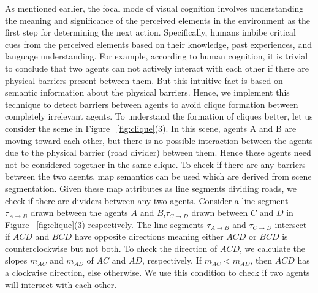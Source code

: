 \documentclass[letterpaper, 10 pt, conference]{ieeeconf}  %
\begin{document}
As mentioned earlier, the focal mode of visual cognition involves understanding the meaning and significance of the perceived elements in the environment as the first step for determining the next action. Specifically, humans imbibe critical cues from the perceived elements based on their knowledge, past experiences, and language understanding. For example, according to human cognition, it is trivial to conclude that two agents can not actively interact with each other if there are physical barriers present between them. But this intuitive fact is based on semantic information about the physical barriers. Hence, we implement this technique to detect barriers between agents to avoid clique formation between completely irrelevant agents. 
To understand the formation of cliques better, let us consider the scene in Figure ~\ref{fig:clique}(3).
In this scene, agents A and B are moving toward each other, but there is no possible interaction between the agents due to the physical barrier (road divider) between them. Hence these agents need not be considered together in the same clique.  To check if there are any barriers between the two agents, map semantics can be used which are derived from scene segmentation. Given these map attributes as line segments dividing roads, we check if there are dividers between any two agents. Consider a line segment $\tau_{A \rightarrow{B}}$ drawn between the agents $A$ and $B$,$\tau_{C \rightarrow D}$ drawn between $C$ and $D$ in Figure ~\ref{fig:clique}(3) respectively. The line segments $\tau_{A \rightarrow{B}}$ and $\tau_{C\rightarrow D}$ intersect if $ACD$ and $BCD$ have opposite directions meaning either $ACD$ or $BCD$ is counterclockwise but not both. To check the direction of $ACD$, we calculate the slopes $m_{AC}$ and $m_{AD}$ of $AC$ and $AD$, respectively.  If $m_{AC} < m_{AD}$, then $ACD$ has a clockwise direction, else otherwise. We use this condition to check %
if two agents will intersect with each other.
\end{document}
